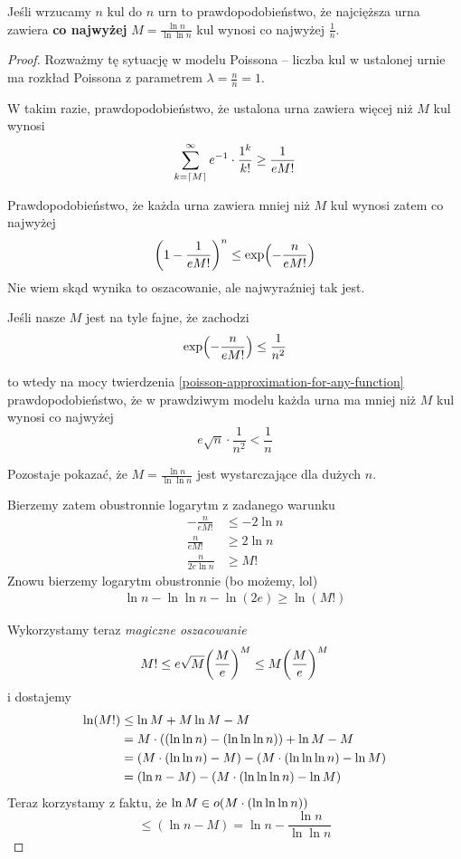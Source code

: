 \begin{theorem}[Lemat 5.12 P\&C]
    Jeśli wrzucamy \( n \) kul do \( n \) urn
    to prawdopodobieństwo, że najcięższa urna zawiera \textbf{co najwyżej} \( M = \frac{\ln n}{\ln \ln n} \) kul wynosi co najwyżej \( \frac{1}{n} \).
\end{theorem}
\begin{proof}
    Rozważmy tę sytuację w modelu Poissona -- liczba kul w ustalonej urnie ma rozkład Poissona z parametrem \( \lambda = \frac{n}{n} = 1 \).
    
    W takim razie, prawdopodobieństwo, że ustalona urna zawiera więcej niż \( M \) kul wynosi
    \[
        \sum_{k=\left\lceil M\right\rceil}^\infty e^{-1} \cdot \frac{1^k}{k!} \geq \frac{1}{eM!}
    \]
    
    Prawdopodobieństwo, że każda urna zawiera mniej niż \( M \) kul wynosi zatem co najwyżej
    \[
        \pars{1 - \frac{1}{eM!}}^n \leq \exp\pars{-\frac{n}{eM!}}
    \]
    Nie wiem skąd wynika to oszacowanie, ale najwyraźniej tak jest.
    
    Jeśli nasze \( M \) jest na tyle fajne, że zachodzi 
    \[
        \exp\pars{-\frac{n}{eM!}} \leq \frac{1}{n^2}
    \]
    
    to wtedy na mocy twierdzenia \ref{poisson-approximation-for-any-function}
    prawdopodobieństwo, że w prawdziwym modelu każda urna ma mniej niż \( M \) kul wynosi co najwyżej
    \[
        e \sqrt{n} \cdot \frac{1}{n^2} < \frac{1}{n}
    \]
    
    Pozostaje pokazać, że \( M = \frac{\ln n}{\ln \ln n} \) jest wystarczające dla dużych \( n \).
    
    Bierzemy zatem obustronnie logarytm z zadanego warunku
    \begin{align*}
        -\frac{n}{eM!} &\leq -2\ln n \\
        \frac{n}{eM!} &\geq 2 \ln n \\
        \frac{n}{2e \ln n} &\geq M!
    \end{align*}
    Znowu bierzemy logarytm obustronnie (bo możemy, lol)
    \begin{align*}
        \ln n - \ln \ln n - \ln (2e) \geq \ln (M!)
    \end{align*}
    
    Wykorzystamy teraz \textit{magiczne oszacowanie} 
    \[ M! \leq e\sqrt{M}\pars{\frac{M}{e}}^M \leq M\pars{\frac{M}{e}}^M \]
    i dostajemy
    \begin{align*}
            \ln (M!)
            &\leq \ln M + M \ln M - M \\
            &= M \cdot \left((\ln \ln n) - (\ln \ln \ln n)\right) + \ln M - M \\
            &= \left(M \cdot (\ln \ln n) - M\right) - \left(M \cdot (\ln \ln \ln n) - \ln M\right) \\
            &= (\ln n - M) - \left(M \cdot (\ln \ln \ln n) - \ln M\right) \\
    \end{align*}
    Teraz korzystamy z faktu, że \( \ln M \in o\pars{M \cdot (\ln \ln \ln n)} \)
    \[
        \leq (\ln n - M) = \ln n - \frac{\ln n}{\ln \ln n}
    \]
    

\end{proof}
